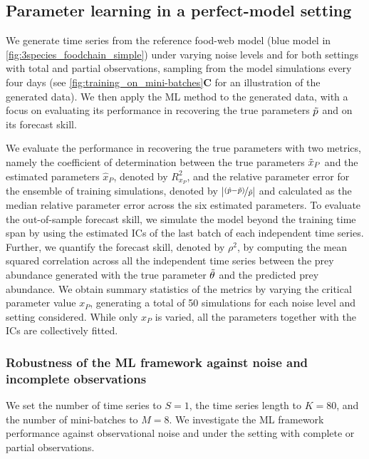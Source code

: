 \subsection{Parameter learning in a perfect-model setting}\label{sec:perfect-model}

We generate time series from the reference food-web model (blue model in \cref{fig:3species_foodchain_simple}) under varying noise levels and for both settings with total and partial observations, sampling from the model simulations every four days (see \cref{fig:training_on_mini-batches}\textbf{C} for an illustration of the generated data).
%
We then apply the ML method to the generated data, with a focus on evaluating its performance in recovering the true parameters $\Tilde{p}$ and on its forecast skill.

We evaluate the performance in recovering the true parameters with two metrics, namely the coefficient of determination between the true parameters $\Tilde x_P$ and the estimated parameters $\hat x_P$, denoted by $R^2_{x_P}$, and the relative parameter error for the ensemble of training simulations, denoted by $|\nicefrac{(\hat p -\Tilde{p})}{\Tilde{p}}|$ and calculated as the median relative parameter error across the six estimated parameters.
%
To evaluate the out-of-sample forecast skill, we simulate the model beyond the training time span by using the estimated ICs of the last batch of each independent time series. Further, we quantify the forecast skill, denoted by $\rho^2$, by computing the mean squared correlation across all the independent time series between the prey abundance generated with the true parameter $\Tilde{\theta}$ and the predicted prey abundance.
% 
We obtain summary statistics of the metrics by varying the critical parameter value $x_P$, generating a total of 50 simulations for each noise level and setting considered.  While only $x_P$ is varied, all the parameters together with the ICs are collectively fitted. 

\subsubsection{Robustness of the ML framework against noise and incomplete observations}
We set the number of time series to $S=1$, the time series length to $K = 80$, and the number of mini-batches to $M = 8$. We investigate the ML framework performance against observational noise and under the setting with complete or partial observations.

